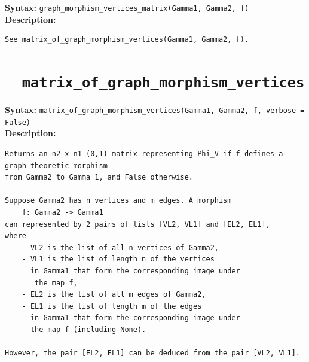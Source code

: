 \documentclass{article}
\begin{document}
\textbf{Syntax:} \verb}graph_morphism_vertices_matrix(Gamma1, Gamma2, f)}\\

\textbf{Description:}
\begin{verbatim}
See matrix_of_graph_morphism_vertices(Gamma1, Gamma2, f).
\end{verbatim}

\section{\tt \ \  matrix\_of\_graph\_morphism\_vertices}

\textbf{Syntax:} \verb}matrix_of_graph_morphism_vertices(Gamma1, Gamma2, f, verbose = False)}\\

\textbf{Description:}
\begin{verbatim}
Returns an n2 x n1 (0,1)-matrix representing Phi_V if f defines a graph-theoretic morphism
from Gamma2 to Gamma 1, and False otherwise.

Suppose Gamma2 has n vertices and m edges. A morphism 
    f: Gamma2 -> Gamma1
can represented by 2 pairs of lists [VL2, VL1] and [EL2, EL1],
where
    - VL2 is the list of all n vertices of Gamma2,
    - VL1 is the list of length n of the vertices
      in Gamma1 that form the corresponding image under
       the map f,
    - EL2 is the list of all m edges of Gamma2,
    - EL1 is the list of length m of the edges
      in Gamma1 that form the corresponding image under
      the map f (including None).

However, the pair [EL2, EL1] can be deduced from the pair [VL2, VL1].
\end{verbatim}
\end{document}
